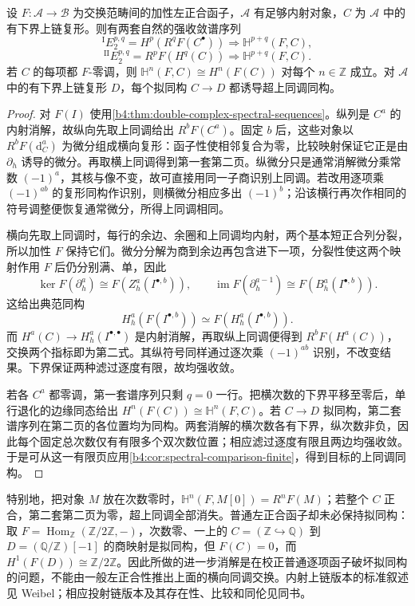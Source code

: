 \begin{theorem}\label{b4:thm:hypercohomology-spectral-sequences}
	设 \(F:\mathcal A\to\mathcal B\) 为交换范畴间的加性左正合函子，\(\mathcal A\) 有足够内射对象，\(C\) 为 \(\mathcal A\) 中的有下界上链复形。则有两套自然的强收敛谱序列
	\[
		{}^{\mathrm I}E_2^{p,q}=H^p(R^qF(C^\bullet)) \Longrightarrow\mathbb H^{p+q}(F,C),
	\]
	\[
		{}^{\mathrm {II}}E_2^{p,q}=R^pF(H^q(C)) \Longrightarrow\mathbb H^{p+q}(F,C).
	\]
	若 \(C\) 的每项都 \(F\)-零调，则 \(\mathbb H^n(F,C)\cong H^n(F(C))\) 对每个 \(n\in\mathbb Z\) 成立。对 \(\mathcal A\) 中的有下界上链复形 \(D\)，每个拟同构 \(C\to D\) 都诱导超上同调同构。
\end{theorem}
\begin{proof}
	对 \(F(I)\) 使用\cref{b4:thm:double-complex-spectral-sequences}。纵列是 \(C^a\) 的内射消解，故纵向先取上同调给出 \(R^bF(C^a)\)。固定 \(b\) 后，这些对象以 \(R^bF(\mathrm d_C^a)\) 为微分组成横向复形：函子性使相邻复合为零，比较映射保证它正是由 \(\partial_h\) 诱导的微分。再取横上同调得到第一套第二页。纵微分只是通常消解微分乘常数 \((-1)^a\)，其核与像不变，故可直接用同一子商识别上同调。若改用逐项乘 \((-1)^{ab}\) 的复形同构作识别，则横微分相应多出 \((-1)^b\)；沿该横行再次作相同的符号调整便恢复通常微分，所得上同调相同。

	横向先取上同调时，每行的余边、余圈和上同调均内射，两个基本短正合列分裂，所以加性 \(F\) 保持它们。微分分解为商到余边再包含进下一项，分裂性使这两个映射作用 \(F\) 后仍分别满、单，因此
	\[
		\ker F(\partial_h^a)\cong F(Z_h^a(I^{\bullet,b})),\qquad \operatorname{im}F(\partial_h^{a-1})\cong F(B_h^a(I^{\bullet,b})).
	\]
	这给出典范同构
	\[
		H_h^a(F(I^{\bullet,b}))\simeq F(H_h^a(I^{\bullet,b})).
	\]
	而 \(H^a(C)\to H_h^a(I^{\bullet,\bullet})\) 是内射消解，再取纵上同调便得到 \(R^bF(H^a(C))\)，交换两个指标即为第二式。其纵符号同样通过逐次乘 \((-1)^{ab}\) 识别，不改变结果。下界保证两种滤过逐度有限，故均强收敛。

	若各 \(C^a\) 都零调，第一套谱序列只剩 \(q=0\) 一行。把横次数的下界平移至零后，单行退化的边缘同态给出 \(H^n(F(C))\cong\mathbb H^n(F,C)\)。若 \(C\to D\) 拟同构，第二套谱序列在第二页的各位置均为同构。两套消解的横次数各有下界，纵次数非负，因此每个固定总次数仅有有限多个双次数位置；相应滤过逐度有限且两边均强收敛。于是可从这一有限页应用\cref{b4:cor:spectral-comparison-finite}，得到目标的上同调同构。
\end{proof}

特别地，把对象 \(M\) 放在次数零时，\(\mathbb H^n(F,M[0])=R^nF(M)\)；若整个 \(C\) 正合，第二套第二页为零，超上同调全部消失。普通左正合函子却未必保持拟同构：取 \(F=\operatorname{Hom}_{\mathbb Z}(\mathbb Z/2\mathbb Z,-)\)，次数零、一上的 \(C=(\mathbb Z\hookrightarrow\mathbb Q)\) 到 \(D=(\mathbb Q/\mathbb Z)[-1]\) 的商映射是拟同构，但 \(F(C)=0\)，而 \(H^1(F(D))\cong\mathbb Z/2\mathbb Z\)。因此所做的进一步消解是在校正普通逐项函子破坏拟同构的问题，不能由一般左正合性推出上面的横向同调交换。内射上链版本的标准叙述见 Weibel\cite[Cohomology Variant 5.7.9]{Weibel1994HomologicalAlgebra}；相应投射链版本及其存在性、比较和同伦见同书\cite[Definition 5.7.1, Lemma 5.7.2, Exercises 5.7.2--5.7.3]{Weibel1994HomologicalAlgebra}。
